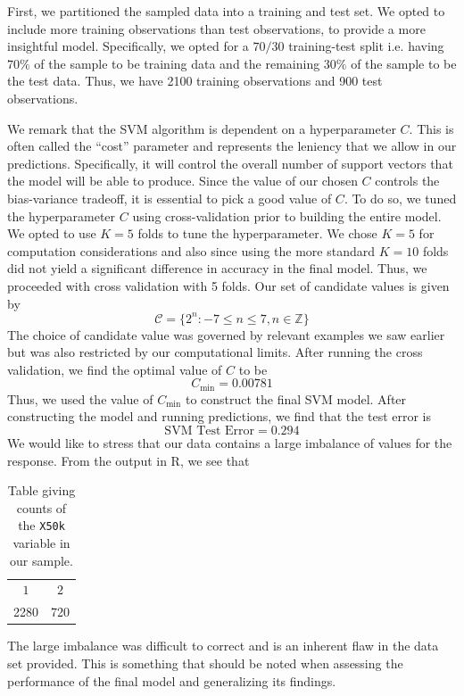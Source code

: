 \documentclass{article}
\begin{document}
    First, we partitioned the sampled data into a training and test set. We opted to include more training observations than test observations, to provide a more insightful model. Specifically, we opted for a $70/30$ training-test split i.e. having $70\%$ of the sample to be training data and the remaining $30\%$ of the sample to be the test data. Thus, we have 2100 training observations and 900 test observations. \par 
    
    We remark that the SVM algorithm is dependent on a hyperparameter $C$. This is often called the ``cost'' parameter and represents the leniency that we allow in our predictions. Specifically, it will control the overall number of support vectors that the model will be able to produce. Since the value of our chosen $C$ controls the bias-variance tradeoff, it is essential to pick a good value of $C$. To do so, we tuned the hyperparameter $C$ using cross-validation prior to building the entire model. We opted to use $K = 5$ folds to tune the hyperparameter. We chose $K = 5$ for computation considerations and also since using the more standard $K = 10$ folds did not yield a significant difference in accuracy in the final model. Thus, we proceeded with cross validation with 5 folds. Our set of candidate values is given by 
    \begin{equation}
    		\mathcal{C} = \{2^n : -7 \leq n \leq 7, n\in \mathbb{Z}\}
    \end{equation}
    The choice of candidate value was governed by relevant examples we saw earlier but was also restricted by our computational limits. After running the cross validation, we find the optimal value of $C$ to be 
    \begin{equation}
    		C_{\text{min}} = 0.00781
    \end{equation}
    Thus, we used the value of $C_{\text{min}}$ to construct the final SVM model. After constructing the model and running predictions, we find that the test error is 
    \begin{equation}
    		\text{SVM Test Error} = 0.294
    \end{equation}
    We would like to stress that our data contains a large imbalance of values for the response. From the output in R, we see that 
    \begin{table}[H]
    		\centering
    		\begin{tabular}{cc}
    			\toprule 
    			$1$ & $2$ \\ 
    			2280 & 720 \\ 
    			\bottomrule
    		\end{tabular}
    		\caption{Table giving counts of the \texttt{X50k} variable in our sample.}
    		\label{tab:countsX50kSample}
    \end{table}
    The large imbalance was difficult to correct and is an inherent flaw in the data set provided. This is something that should be noted when assessing the performance of the final model and generalizing its findings. \par 
    
\end{document}
